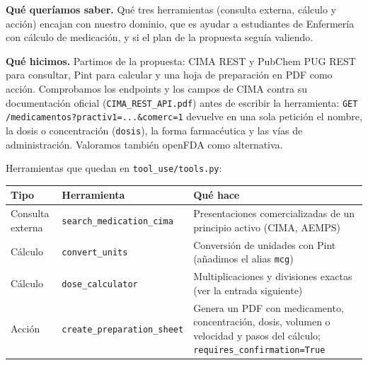 \textbf{Qué queríamos saber.} Qué tres herramientas (consulta externa, cálculo y acción) encajan con
nuestro dominio, que es ayudar a estudiantes de Enfermería con cálculo de medicación, y si el
plan de la propuesta seguía valiendo.

\textbf{Qué hicimos.} Partimos de la propuesta: CIMA REST y PubChem PUG REST para consultar, Pint para
calcular y una hoja de preparación en PDF como acción. Comprobamos los endpoints y los campos de
CIMA contra su documentación oficial (\texttt{CIMA\_\allowbreak{}REST\_\allowbreak{}API.pdf}) antes de escribir la
herramienta: \texttt{GET /\allowbreak{}medicamentos?practiv1=\allowbreak{}...\&comerc=\allowbreak{}1} devuelve en una sola petición el nombre,
la dosis o concentración (\texttt{dosis}), la forma farmacéutica y las vías de administración. Valoramos
también openFDA como alternativa.

Herramientas que quedan en \texttt{tool\_\allowbreak{}use/\allowbreak{}tools.py}:

{\def\LTcaptype{none} %
\small\setlength{\tabcolsep}{3pt}
\begin{longtable}[]{@{}
  >{\raggedright\arraybackslash}p{}
  >{\raggedright\arraybackslash}p{}
  >{\raggedright\arraybackslash}p{}@{}}
\toprule\noalign{}
\begin{minipage}[b]{\linewidth}\raggedright
Tipo
\end{minipage} & \begin{minipage}[b]{\linewidth}\raggedright
Herramienta
\end{minipage} & \begin{minipage}[b]{\linewidth}\raggedright
Qué hace
\end{minipage} \\
\midrule\noalign{}
\endhead
\bottomrule\noalign{}
\endlastfoot
Consulta externa & \texttt{search\_\allowbreak{}medication\_\allowbreak{}cima} & Presentaciones comercializadas de un principio activo (CIMA, AEMPS) \\
Cálculo & \texttt{convert\_\allowbreak{}units} & Conversión de unidades con Pint (añadimos el alias \texttt{mcg}) \\
Cálculo & \texttt{dose\_\allowbreak{}calculator} & Multiplicaciones y divisiones exactas (ver la entrada siguiente) \\
Acción & \texttt{create\_\allowbreak{}preparation\_\allowbreak{}sheet} & Genera un PDF con medicamento, concentración, dosis, volumen o velocidad y pasos del cálculo; \texttt{requires\_\allowbreak{}confirmation=\allowbreak{}True} \\
\end{longtable}
}

